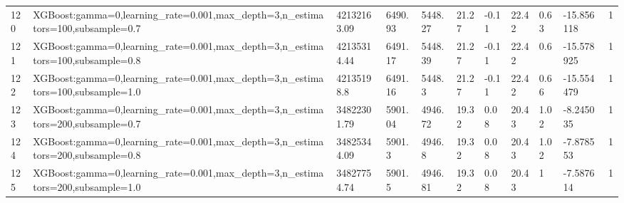 \begin{longtable}{C{0.8cm} L{2cm} C{1.15cm} C{1.15cm} C{1.15cm} C{1.15cm} C{0.85cm} C{1.25cm} C{1.2cm} C{1.5cm} C{1.0cm}}
120 & XGBoost:\newline gamma=0,\newline learning\_rate=0.001,\newline max\_depth=3,\newline n\_estimators=100,\newline subsample=0.7 & 42132163.09 & 6490.93 & 5448.27 & 21.27 & -0.11 & 22.42 & 0.63 & -15.856118 & 1 \\
121 & XGBoost:\newline gamma=0,\newline learning\_rate=0.001,\newline max\_depth=3,\newline n\_estimators=100,\newline subsample=0.8 & 42135314.44 & 6491.17 & 5448.39 & 21.27 & -0.11 & 22.42 & 0.6 & -15.578925 & 1 \\
122 & XGBoost:\newline gamma=0,\newline learning\_rate=0.001,\newline max\_depth=3,\newline n\_estimators=100,\newline subsample=1.0 & 42135198.8 & 6491.16 & 5448.3 & 21.27 & -0.11 & 22.42 & 0.66 & -15.554479 & 1 \\
123 & XGBoost:\newline gamma=0,\newline learning\_rate=0.001,\newline max\_depth=3,\newline n\_estimators=200,\newline subsample=0.7 & 34822301.79 & 5901.04 & 4946.72 & 19.32 & 0.08 & 20.43 & 1.02 & -8.245035 & 1 \\
124 & XGBoost:\newline gamma=0,\newline learning\_rate=0.001,\newline max\_depth=3,\newline n\_estimators=200,\newline subsample=0.8 & 34825344.09 & 5901.3 & 4946.8 & 19.32 & 0.08 & 20.43 & 1.02 & -7.878553 & 1 \\
125 & XGBoost:\newline gamma=0,\newline learning\_rate=0.001,\newline max\_depth=3,\newline n\_estimators=200,\newline subsample=1.0 & 34827754.74 & 5901.5 & 4946.81 & 19.32 & 0.08 & 20.43 & 1 & -7.587614 & 1 \\

\end{longtable}
